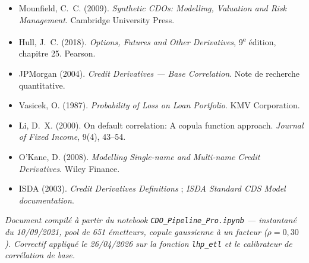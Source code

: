 \documentclass[11pt,a4paper]{article}
\begin{document}
\begin{itemize}
\item Mounfield, C.~C. (2009). \emph{Synthetic CDOs: Modelling, Valuation and
      Risk Management}. Cambridge University Press.
\item Hull, J.~C. (2018). \emph{Options, Futures and Other Derivatives},
      9\textsuperscript{e} édition, chapitre 25. Pearson.
\item JPMorgan (2004). \emph{Credit Derivatives --- Base Correlation}. Note de
      recherche quantitative.
\item Vasicek, O. (1987). \emph{Probability of Loss on Loan Portfolio}. KMV
      Corporation.
\item Li, D.~X. (2000). On default correlation: A copula function approach.
      \emph{Journal of Fixed Income}, 9(4), 43--54.
\item O'Kane, D. (2008). \emph{Modelling Single-name and Multi-name Credit
      Derivatives}. Wiley Finance.
\item ISDA (2003). \emph{Credit Derivatives Definitions} ; \emph{ISDA Standard
      CDS Model documentation}.
\end{itemize}

\vfill
\begin{center}\small
\textit{Document compilé à partir du notebook \texttt{CDO\_Pipeline\_Pro.ipynb}
--- instantané du 10/09/2021, pool de 651 émetteurs, copule gaussienne à un
facteur ($\rho = 0{,}30$). Correctif appliqué le 26/04/2026 sur la fonction
\texttt{lhp\_etl} et le calibrateur de corrélation de base.}
\end{center}
\end{document}
